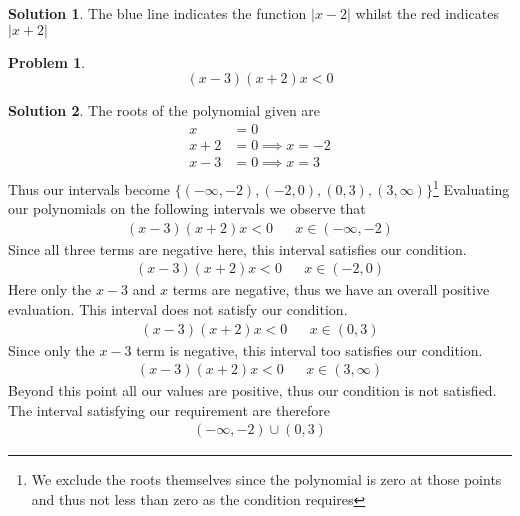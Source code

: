 \documentclass[a4paper]{article}
\theoremstyle{definition}
\newtheorem{problem}{Problem}[section]
\newtheorem*{solution}{Solution}
\begin{document}
\begin{solution}
The blue line indicates the function \(|x-2|\) whilst the red indicates \(|x+2|\)


\end{solution}

\begin{problem}
\[
(x-3)(x+2)x < 0
\]
\end{problem}
\begin{solution}
The roots of the polynomial given are
\begin{align*}
x &= 0 \\
x+2 &= 0 \implies x = -2 \\
x-3 &= 0 \implies x = 3 \\
\end{align*}
Thus our intervals become \(\{(-\infty, -2), (-2, 0), (0, 3), (3, \infty)\}\)\footnote{We exclude the roots themselves since the polynomial is zero at those points and thus not less than zero as the condition requires}
Evaluating our polynomials on the following intervals we observe that
\begin{align*}
(x-3)(x+2)x < 0 &&x \in (-\infty, -2)
\end{align*}
Since all three terms are negative here, this interval satisfies our condition.
\begin{align*}
(x-3)(x+2)x < 0 &&x \in (-2, 0)
\end{align*}
Here only the \(x-3\) and \(x\) terms are negative, thus we have an overall positive evaluation. This interval does not satisfy our condition.
\begin{align*}
(x-3)(x+2)x < 0 &&x \in (0, 3)
\end{align*}
Since only the \(x-3\) term is negative, this interval too satisfies our condition.
\begin{align*}
(x-3)(x+2)x < 0 &&x \in (3, \infty)
\end{align*}
Beyond this point all our values are positive, thus our condition is not satisfied. The interval satisfying our requirement are therefore
\begin{align*}
(-\infty, -2) \cup (0, 3)
\end{align*}
\end{solution}
\end{document}
